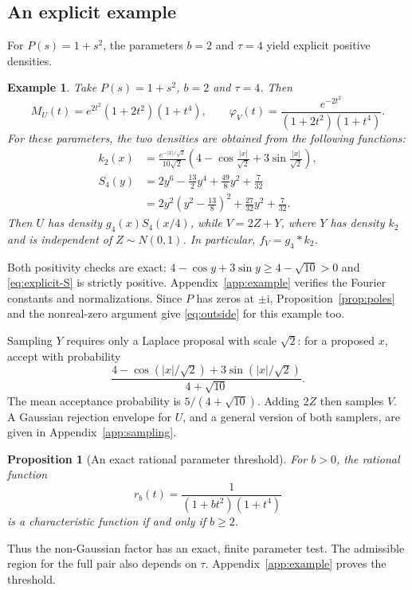 \documentclass[11pt,twoside]{article}
\theoremstyle{journalplain}
\numberwithin{equation}{section}
\newtheorem{proposition}[theorem]{Proposition}
\theoremstyle{journaldefinition}
\newtheorem{example}[theorem]{Example}
\newcommand{\ii}{\mathrm i}
\begin{document}
\subsection{An explicit example}
For $P(s)=1+s^2$, the parameters $b=2$ and $\tau=4$ yield explicit positive densities.
\begin{example}\label{ex:explicit}
Take $P(s)=1+s^2$, $b=2$ and $\tau=4$. Then
\begin{equation}\label{eq:explicit-pair}
 M_U(t)=e^{2t^2}(1+2t^2)(1+t^4),\qquad
 \varphi_V(t)=\frac{e^{-2t^2}}{(1+2t^2)(1+t^4)}.
\end{equation}
For these parameters, the two densities are obtained from the following functions:
\begin{align}
 k_2(x)&=\frac{e^{-|x|/\sqrt2}}{10\sqrt2}
 \left(4-\cos\frac{|x|}{\sqrt2}+3\sin\frac{|x|}{\sqrt2}\right),\label{eq:explicit-k}\\
 S_4(y)&=2y^6-\frac{13}{2}y^4+\frac{49}{8}y^2+\frac7{32}\nonumber\\
 &=2y^2\left(y^2-\frac{13}{8}\right)^2+\frac{27}{32}y^2+\frac7{32}.
 \label{eq:explicit-S}
\end{align}
Then $U$ has density $g_4(x)S_4(x/4)$, while $V=2Z+Y$, where $Y$ has density $k_2$ and is independent of $Z\sim N(0,1)$. In particular, $f_V=g_4*k_2$.
\end{example}
Both positivity checks are exact: $4-\cos y+3\sin y\ge4-\sqrt{10}>0$ and \eqref{eq:explicit-S} is strictly positive. Appendix~\ref{app:example} verifies the Fourier constants and normalizations. Since $P$ has zeros at $\pm\ii$, Proposition~\ref{prop:poles} and the nonreal-zero argument give \eqref{eq:outside} for this example too.

Sampling $Y$ requires only a Laplace proposal with scale $\sqrt2$: for a proposed $x$, accept with probability
\begin{equation}\label{eq:sample-Y}
 \frac{4-\cos(|x|/\sqrt2)+3\sin(|x|/\sqrt2)}{4+\sqrt{10}}.
\end{equation}
The mean acceptance probability is $5/(4+\sqrt{10})$. Adding $2Z$ then samples $V$. A Gaussian rejection envelope for $U$, and a general version of both samplers, are given in Appendix~\ref{app:sampling}.


\begin{proposition}[An exact rational parameter threshold]\label{prop:threshold}
For $b>0$, the rational function
\[
 r_b(t)=\frac1{(1+bt^2)(1+t^4)}
\]
is a characteristic function if and only if $b\ge2$.
\end{proposition}
Thus the non-Gaussian factor has an exact, finite parameter test. The admissible region for the full pair also depends on $\tau$. Appendix~\ref{app:example} proves the threshold.
\end{document}
